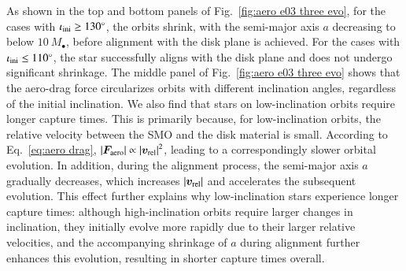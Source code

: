 \documentclass[aps,prx,reprint,superscriptaddress,nofootinbib,longbibliography]{revtex4-1}
\begin{document}
As shown in the top and bottom panels of Fig.~\ref{fig:aero e03 three evo}, for the cases with $\iota_{\rm ini}\geq 130^{\circ}$, the orbits shrink, with the semi-major axis $a$ decreasing to below $10\ M_{\bullet}$, before alignment with the disk plane is achieved. For the cases with $\iota_{\rm ini}\leq 110^{\circ}$, the star successfully aligns with the disk plane and does not undergo significant shrinkage. The middle panel of Fig.~\ref{fig:aero e03 three evo} shows that the aero-drag force circularizes orbits with different inclination angles, regardless of the initial inclination.
We also find that stars on low-inclination orbits require longer capture times. This is primarily because, for low-inclination orbits, the relative velocity between the SMO and the disk material is small. According to Eq.~\eqref{eq:aero drag}, $\abs{\boldsymbol{F}_{\rm aero}}\propto \abs{\boldsymbol{v}_{\rm rel}}^{2}$, leading to a correspondingly slower orbital evolution. In addition, during the alignment process, the semi-major axis $a$ gradually decreases, which increases $\abs{\boldsymbol{v}_{\rm rel}}$ and accelerates the subsequent evolution. This effect further explains why low-inclination stars experience longer capture times: although high-inclination orbits require larger changes in inclination, they initially evolve more rapidly due to their larger relative velocities, and the accompanying shrinkage of $a$ during alignment further enhances this evolution, resulting in shorter capture times overall.
\end{document}
